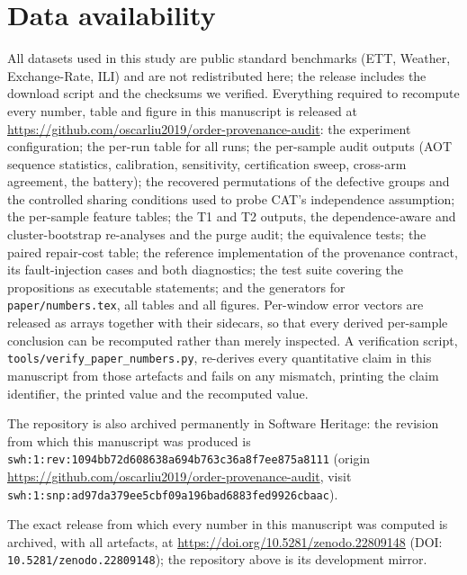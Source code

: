 \documentclass[a4paper,fleqn]{cas-sc}
\begin{document}
\section*{Data availability}
All datasets used in this study are public standard benchmarks (ETT, Weather,
Exchange-Rate, ILI) and are not redistributed here; the release includes the
download script and the checksums we verified. Everything required to recompute
every number, table and figure in this manuscript is released at
\url{https://github.com/oscarliu2019/order-provenance-audit}: the experiment
configuration; the per-run table for all \NumRuns{} runs; the per-sample audit
outputs (AOT sequence statistics, calibration, sensitivity, certification sweep,
cross-arm agreement, the battery); the recovered permutations of the
\NumObsPermGroups{} defective groups and the controlled sharing conditions used to
probe CAT's independence assumption; the per-sample feature tables; the T1 and T2
outputs, the dependence-aware and cluster-bootstrap re-analyses and the purge
audit; the equivalence tests; the paired repair-cost table; the reference
implementation of the provenance contract, its \NumContractFaults{} fault-injection
cases and both diagnostics; the test suite covering the
propositions as executable statements; and the generators for
\texttt{paper/numbers.tex}, all tables and all figures. Per-window error vectors
are released as arrays together with their sidecars, so that every derived
per-sample conclusion can be recomputed rather than merely inspected. A
verification script,
\texttt{tools/verify\_paper\_numbers.py}, re-derives every quantitative claim in
this manuscript from those artefacts and fails on any mismatch, printing the claim
identifier, the printed value and the recomputed value.




\begin{sloppypar}
The repository is also archived permanently in Software Heritage: the revision
from which this manuscript was produced is \texttt{swh:1:rev:1094bb72d608638a694b763c36a8f7ee875a8111}
(origin \url{https://github.com/oscarliu2019/order-provenance-audit}, visit \texttt{swh:1:snp:ad97da379ee5cbf09a196bad6883fed9926cbaac}).
\end{sloppypar}

The exact release from which every number in this manuscript was computed is
archived, with all artefacts, at \url{https://doi.org/10.5281/zenodo.22809148} (DOI: \texttt{10.5281/zenodo.22809148}); the
repository above is its development mirror.



\end{document}

